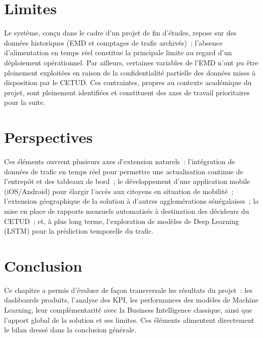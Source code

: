 \section{Limites}
Le syst\`eme, conçu dans le cadre d'un projet de fin d'études, repose sur des données historiques (EMD et comptages de trafic archivés)~; l'absence d'alimentation en temps réel constitue la principale limite au regard d'un déploiement opérationnel. Par ailleurs, certaines variables de l'EMD n'ont pu être pleinement exploitées en raison de la confidentialité partielle des données mises \`a disposition par le CETUD. Ces contraintes, propres au contexte académique du projet, sont pleinement identifiées et constituent des axes de travail prioritaires pour la suite.

\section{Perspectives}
Ces éléments ouvrent plusieurs axes d'extension naturels~: l'intégration de données de trafic en temps réel pour permettre une actualisation continue de l'entrepôt et des tableaux de bord~; le développement d'une application mobile (iOS/Android) pour élargir l'accès aux citoyens en situation de mobilité~; l'extension géographique de la solution \`a d'autres agglomérations sénégalaises~; la mise en place de rapports mensuels automatisés \`a destination des décideurs du CETUD~; et, \`a plus long terme, l'exploration de mod\`eles de Deep Learning (LSTM) pour la prédiction temporelle du trafic.

\section{Conclusion}
Ce chapitre a permis d'évaluer de façon transversale les résultats du projet~: les dashboards produits, l'analyse des KPI, les performances des modèles de Machine Learning, leur complémentarité avec la Business Intelligence classique, ainsi que l'apport global de la solution et ses limites. Ces éléments alimentent directement le bilan dressé dans la conclusion générale.

\clearpage
